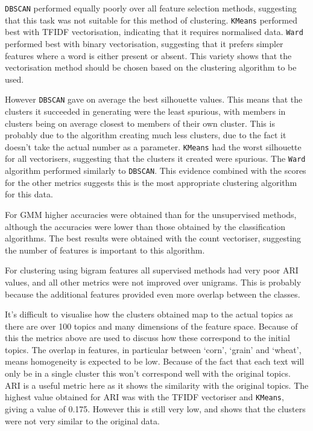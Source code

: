 \documentclass{article}
\begin{document}
\verb|DBSCAN| performed equally poorly over all feature selection methods, suggesting that this task was not suitable for this method of clustering. \verb|KMeans| performed best with TFIDF vectorisation, indicating that it requires normalised data. \verb|Ward| performed best with binary vectorisation, suggesting that it prefers simpler features where a word is either present or absent. This variety shows that the vectorisation method should be chosen based on the clustering algorithm to be used.

However \verb|DBSCAN| gave on average the best silhouette values. This means that the clusters it succeeded in generating were the least spurious, with members in clusters being on average closest to members of their own cluster. This is probably due to the algorithm creating much less clusters, due to the fact it doesn't take the actual number as a parameter. \verb|KMeans| had the worst silhouette for all vectorisers, suggesting that the clusters it created were spurious. The \verb|Ward| algorithm performed similarly to \verb|DBSCAN|. This evidence combined with the scores for the other metrics suggests this is the most appropriate clustering algorithm for this data.

For GMM higher accuracies were obtained than for the unsupervised methods, although the accuracies were lower than those obtained by the classification algorithms. The best results were obtained with the count vectoriser, suggesting the number of features is important to this algorithm.

For clustering using bigram features all supervised methods had very poor ARI values, and all other metrics were not improved over unigrams. This is probably because the additional features provided even more overlap between the classes. 

It's difficult to visualise how the clusters obtained map to the actual topics as there are over 100 topics and many dimensions of the feature space. Because of this the metrics above are used to discuss how these correspond to the initial topics. The overlap in  features, in particular between `corn', `grain' and `wheat', means homogeneity is expected to be low. Because of the fact that each text will only be in a single cluster this won't correspond well with the original topics. ARI is a useful metric here as it shows the similarity with the original topics. The highest value obtained for ARI was with the TFIDF vectoriser and \verb|KMeans|, giving a value of 0.175. However this is still very low, and shows that the clusters were not very similar to the original data.
\end{document}
